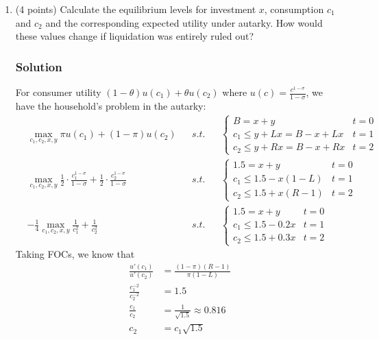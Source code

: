 \documentclass[12pt]{article}
\begin{document}
\begin{enumerate}[label=(\alph*)]
    \item (4 points) Calculate the equilibrium levels for investment $x$, consumption $c_1$ and $c_2$ and the corresponding expected utility under autarky. How would these values change if liquidation was entirely ruled out?
    \subsubsection*{Solution}

    For consumer utility $(1-\theta)u(c_1)+\theta u(c_2)$ where $u(c) = \frac{c^{1-\sigma}}{1-\sigma}$, we have the household's problem in the autarky: 
    \begin{align*}
        &\max_{c_1, c_2, x,y} \pi u(c_1) + (1-\pi)u(c_2) && s.t. && \begin{cases}
            B  =x+y & t=0
            \\ c_1 \leq y + Lx = B-x+Lx & t=1
            \\ c_2 \leq y + Rx = B-x + Rx & t=2
        \end{cases}
        \\ &\max_{c_1, c_2, x,y} \frac{1}{2} \cdot  \frac{c_1^{1-\sigma}}{1-\sigma} + \frac{1}{2} \cdot  \frac{c_2^{1-\sigma}}{1-\sigma}&& s.t. && \begin{cases}
            1.5  =x+y & t=0
            \\ c_1 \leq 1.5-x(1-L) & t=1
            \\ c_2 \leq 1.5+x(R-1) & t=2
        \end{cases}
        \\ &-\frac{1}{4}\max_{c_1, c_2, x,y} \frac{1}{c_{1}^{2}}+\frac{1}{c_{2}^{2}}  && s.t. && \begin{cases}
             1.5 =x+y & t=0
            \\ c_1 \leq 1.5-0.2x  & t=1
            \\ c_2 \leq 1.5+0.3x & t=2
        \end{cases}
    \end{align*}
    Taking FOCs, we know that 
    \begin{align*}
         \frac{u'(c_1)}{u'(c_2)} &= \frac{(1-\pi)(R-1)}{\pi(1-L)} 
         \\  \frac{c_1^{-2}} {c_2^{-2}}&= 1.5
         \\ \frac{c_1}{c_2}&= \frac{1}{\sqrt{1.5}}\approx 0.816
         \\ c_2 &= c_1 \sqrt{1.5}
    \end{align*}

\end{enumerate}
\end{document}
